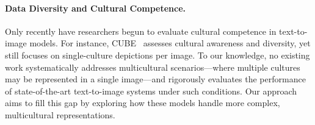 \paragraph{Data Diversity and Cultural Competence.} Only recently have researchers begun to evaluate cultural competence in text-to-image models. For instance, CUBE~\cite{kannen2024beyond} assesses cultural awareness and diversity, yet still focuses on single-culture depictions per image. To our knowledge, no existing work systematically addresses multicultural scenarios—where multiple cultures may be represented in a single image—and rigorously evaluates the performance of state-of-the-art text-to-image systems under such conditions. Our approach aims to fill this gap by exploring how these models handle more complex, multicultural representations.